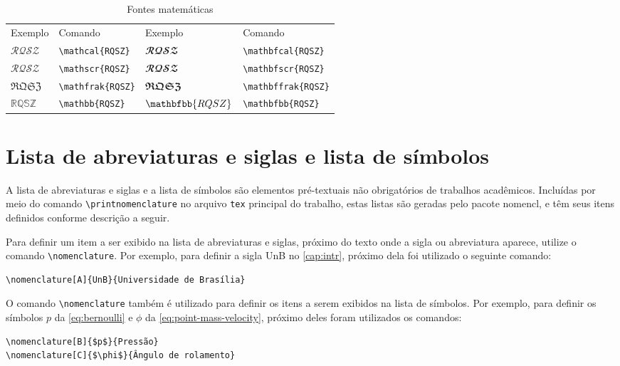 \begin{table}[htb]
\centering
\caption{Fontes matemáticas}
\label{tab:ftmath}
\begin{tabular}{llll}
\toprule
Exemplo & Comando & Exemplo & Comando \\ \cmidrule(lr){1-2} \cmidrule(lr){3-4}
$\mathcal{RQSZ}$ & \verb|\mathcal{RQSZ}| & $\mathbfcal{RQSZ}$ & \verb|\mathbfcal{RQSZ}| \\
$\mathscr{RQSZ}$ & \verb|\mathscr{RQSZ}| & $\mathbfscr{RQSZ}$ & \verb|\mathbfscr{RQSZ}| \\
$\mathfrak{RQSZ}$ & \verb|\mathfrak{RQSZ}| & $\mathbffrak{RQSZ}$ & \verb|\mathbffrak{RQSZ}| \\
$\mathbb{RQSZ}$ & \verb|\mathbb{RQSZ}| & $\mathbfbb{RQSZ}$ & \verb|\mathbfbb{RQSZ}| \\ \bottomrule
\end{tabular}
\end{table}

\section{Lista de abreviaturas e siglas e lista de símbolos}

A lista de abreviaturas e siglas e a lista de símbolos são elementos pré-textuais não obrigatórios de trabalhos acadêmicos. Incluídas por meio do comando \verb|\printnomenclature| no arquivo \texttt{tex} principal do trabalho, estas listas são geradas pelo pacote \textsf{nomencl}, e têm seus itens definidos conforme descrição a seguir.

Para definir um item a ser exibido na lista de abreviaturas e siglas, próximo do texto onde a sigla ou abreviatura aparece, utilize o comando \verb|\nomenclature|. Por exemplo, para definir a sigla UnB no \cref{cap:intr}, próximo dela foi utilizado o seguinte comando:
\begin{verbatim}
\nomenclature[A]{UnB}{Universidade de Brasília}
\end{verbatim}

O comando \verb|\nomenclature| também é utilizado para definir os itens a serem exibidos na lista de símbolos. Por exemplo, para definir os símbolos $p$ da \cref{eq:bernoulli} e $\phi$ da \cref{eq:point-mass-velocity}, próximo deles foram utilizados os comandos:
\begin{verbatim}
\nomenclature[B]{$p$}{Pressão}
\nomenclature[C]{$\phi$}{Ângulo de rolamento}
\end{verbatim}

